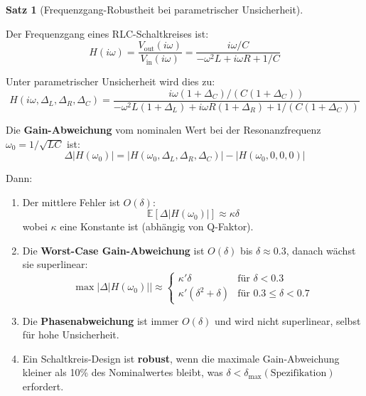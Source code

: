 \documentclass[a4paper, 12pt, twoside, openright]{report}
\theoremstyle{definition}
\theoremstyle{definition}
\newtheorem{satz}{Satz}[chapter]
\begin{document}
\begin{satz}[Frequenzgang-Robustheit bei parametrischer Unsicherheit]
\label{satz:frequenzgang_unsicherheit}

Der Frequenzgang eines RLC-Schaltkreises ist:
\begin{equation}
H(i\omega) = \frac{V_{\text{out}}(i\omega)}{V_{\text{in}}(i\omega)} = \frac{i\omega/C}{-\omega^2 L + i\omega R + 1/C}
\end{equation}

Unter parametrischer Unsicherheit wird dies zu:
\begin{equation}
H(i\omega, \Delta_L, \Delta_R, \Delta_C) = \frac{i\omega(1+\Delta_C)/(C(1+\Delta_C))}{-\omega^2 L(1+\Delta_L) + i\omega R(1+\Delta_R) + 1/(C(1+\Delta_C))}
\end{equation}

Die \textbf{Gain-Abweichung} vom nominalen Wert bei der Resonanzfrequenz $\omega_0 = 1/\sqrt{LC}$ ist:
\begin{equation}
\Delta |H(\omega_0)| = |H(\omega_0, \Delta_L, \Delta_R, \Delta_C)| - |H(\omega_0, 0, 0, 0)|
\end{equation}

Dann:

\begin{enumerate}
    \item Der mittlere Fehler ist $O(\delta)$:
    \begin{equation}
    \mathbb{E}[\Delta |H(\omega_0)|] \approx \kappa \delta
    \end{equation}
    wobei $\kappa$ eine Konstante ist (abhängig von Q-Faktor).
    
    \item Die \textbf{Worst-Case Gain-Abweichung} ist $O(\delta)$ bis $\delta \approx 0.3$, danach wächst sie superlinear:
    \begin{equation}
    \max |\Delta |H(\omega_0)|| \approx \begin{cases}
    \kappa' \delta & \text{für } \delta < 0.3 \\
    \kappa' (\delta^2 + \delta) & \text{für } 0.3 \leq \delta < 0.7
    \end{cases}
    \end{equation}
    
    \item Die \textbf{Phasenabweichung} ist immer $O(\delta)$ und wird nicht superlinear, selbst für hohe Unsicherheit.
    
    \item Ein Schaltkreis-Design ist \textbf{robust}, wenn die maximale Gain-Abweichung kleiner als 10\% des Nominalwertes bleibt, was $\delta < \delta_{\max}(\text{Spezifikation})$ erfordert.
\end{enumerate}

\end{satz}
\end{document}

